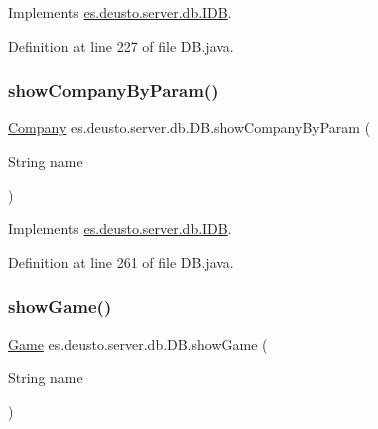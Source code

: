 Implements \hyperlink{interfacees_1_1deusto_1_1server_1_1db_1_1_i_d_b_a1681e29b5fbe4377b19e67fa939b2782}{es.\+deusto.\+server.\+db.\+I\+DB}.



Definition at line 227 of file D\+B.\+java.

\mbox{\label{classes_1_1deusto_1_1server_1_1db_1_1_d_b_a777cd6a4714b8a2838bd2e719f05336f}} 
\subsubsection{\texorpdfstring{show\+Company\+By\+Param()}{showCompanyByParam()}}
{\footnotesize\ttfamily \hyperlink{classes_1_1deusto_1_1server_1_1db_1_1data_1_1_company}{Company} es.\+deusto.\+server.\+db.\+D\+B.\+show\+Company\+By\+Param (\begin{DoxyParamCaption}\item[{String}]{name }\end{DoxyParamCaption})}



Implements \hyperlink{interfacees_1_1deusto_1_1server_1_1db_1_1_i_d_b_aed0409031510630d50085eca53aff113}{es.\+deusto.\+server.\+db.\+I\+DB}.



Definition at line 261 of file D\+B.\+java.

\mbox{\label{classes_1_1deusto_1_1server_1_1db_1_1_d_b_adba76c20f2fc7ed01d486564d881a718}} 
\subsubsection{\texorpdfstring{show\+Game()}{showGame()}}
{\footnotesize\ttfamily \hyperlink{classes_1_1deusto_1_1server_1_1db_1_1data_1_1_game}{Game} es.\+deusto.\+server.\+db.\+D\+B.\+show\+Game (\begin{DoxyParamCaption}\item[{String}]{name }\end{DoxyParamCaption})}



